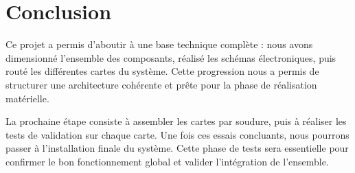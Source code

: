 \chapter{Conclusion}

Ce projet a permis d'aboutir à une base technique complète : nous avons dimensionné l'ensemble des composants, réalisé les schémas électroniques, puis routé les différentes cartes du système.
Cette progression nous a permis de structurer une architecture cohérente et prête pour la phase de réalisation matérielle.

La prochaine étape consiste à assembler les cartes par soudure, puis à réaliser les tests de validation sur chaque carte. Une fois ces essais concluants, nous pourrons passer à l'installation finale du système.
Cette phase de tests sera essentielle pour confirmer le bon fonctionnement global et valider l'intégration de l'ensemble.